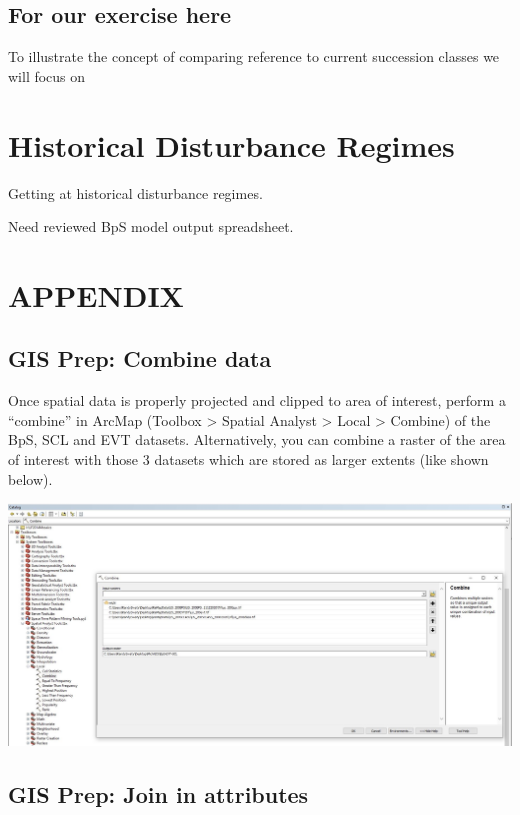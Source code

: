 \documentclass[
]{book}
\begin{document}
\hypertarget{for-our-exercise-here}{%
\section{For our exercise here}\label{for-our-exercise-here}}

To illustrate the concept of comparing reference to current succession classes we will focus on

\hypertarget{histDist}{%
\chapter{Historical Disturbance Regimes}\label{histDist}}

Getting at historical disturbance regimes.

Need reviewed BpS model output spreadsheet.

\hypertarget{gisPrep}{%
\chapter{APPENDIX}\label{gisPrep}}

\hypertarget{gis-prep-combine-data}{%
\section{GIS Prep: Combine data}\label{gis-prep-combine-data}}

Once spatial data is properly projected and clipped to area of interest, perform a ``combine'' in ArcMap (Toolbox \textgreater{} Spatial Analyst \textgreater{} Local \textgreater{} Combine) of the BpS, SCL and EVT datasets. Alternatively, you can combine a raster of the area of interest with those 3 datasets which are stored as larger extents (like shown below).

\includegraphics[width=1\linewidth]{combine}

\hypertarget{gis-prep-join-in-attributes}{%
\section{GIS Prep: Join in attributes}\label{gis-prep-join-in-attributes}}
\end{document}
